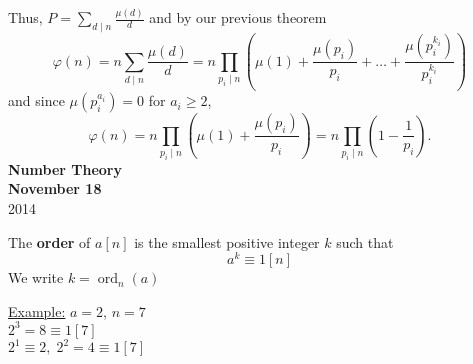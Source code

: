 \documentclass{report}
\DeclareMathOperator{\ord}{ord}
\begin{document}
Thus, $P=\sum_{d\mid n}\frac{\mu(d)}{d}$ and by our previous theorem
\begin{equation*}
\varphi(n) = n\sum_{d\mid n}\frac{\mu(d)}{d}=n\prod_{p_i\mid n}\left(\mu(1) + \frac{\mu(p_i)}{p_i} + \dots + \frac{\mu(p_i^{k_i})}{p_i^{k_i}}\right)
\end{equation*}
and since $\mu(p_i^{a_i})=0$ for $a_i\geq 2$, 
\begin{equation*}
\varphi(n) = n\prod_{p_i\mid n}\left(\mu(1) + \frac{\mu(p_i)}{p_i}\right) = n\prod_{p_i\mid n}\left(1 - \frac{1}{p_i}\right).
\end{equation*}
\newpage
{\centering
	\Large
	\textbf{Number Theory}\\
	\normalsize
	\textbf{November 18}\\
	2014\\
}
\vspace{10mm}
\begin{defi} The \textbf{order} of $a[n]$ is the smallest positive integer $k$ such that
																\[ a^k \equiv 1 [n] \]
						We write $k= \ord_n(a)$
\end{defi}
\underline{Example:} $a=2$, $n=7$\\
	$2^3=8 \equiv 1 [7]$\\
	$2^1 \equiv 2, \; 2^2=4\equiv 1 [7]$\\
\end{document}

